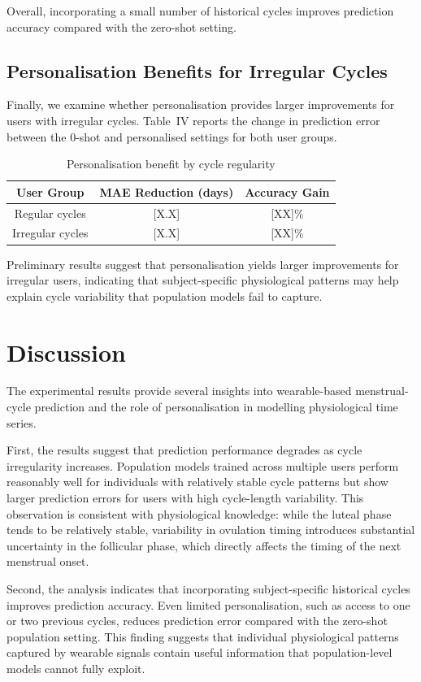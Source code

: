 \documentclass[conference]{IEEEtran}
\begin{document}
Overall, incorporating a small number of historical cycles improves prediction accuracy compared with the zero-shot setting.

\subsection{Personalisation Benefits for Irregular Cycles}

Finally, we examine whether personalisation provides larger improvements for users with irregular cycles. Table~IV reports the change in prediction error between the 0-shot and personalised settings for both user groups.

\begin{table}[h]
\centering
\caption{Personalisation benefit by cycle regularity}
\begin{tabular}{ccc}
\hline
User Group & MAE Reduction (days) & Accuracy Gain \\
\hline
Regular cycles & [X.X] & [XX]\% \\
Irregular cycles & [X.X] & [XX]\% \\
\hline
\end{tabular}
\end{table}

Preliminary results suggest that personalisation yields larger improvements for irregular users, indicating that subject-specific physiological patterns may help explain cycle variability that population models fail to capture.

\section{Discussion}

The experimental results provide several insights into wearable-based menstrual-cycle prediction and the role of personalisation in modelling physiological time series.

First, the results suggest that prediction performance degrades as cycle irregularity increases. Population models trained across multiple users perform reasonably well for individuals with relatively stable cycle patterns but show larger prediction errors for users with high cycle-length variability. This observation is consistent with physiological knowledge: while the luteal phase tends to be relatively stable, variability in ovulation timing introduces substantial uncertainty in the follicular phase, which directly affects the timing of the next menstrual onset.

Second, the analysis indicates that incorporating subject-specific historical cycles improves prediction accuracy. Even limited personalisation, such as access to one or two previous cycles, reduces prediction error compared with the zero-shot population setting. This finding suggests that individual physiological patterns captured by wearable signals contain useful information that population-level models cannot fully exploit.
\end{document}
